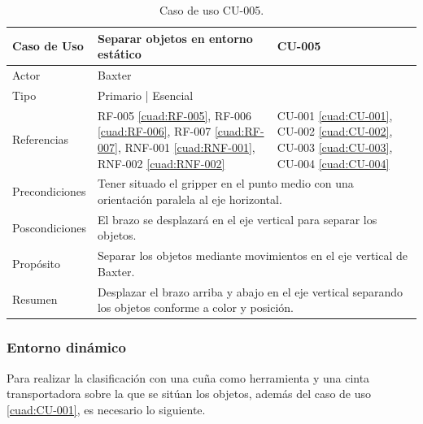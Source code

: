 \begin{table}[H]
	\centering
	\begin{tabular}{|p{2.5cm} | p{6cm} | p{5cm} |}
		\hline
		\textbf{Caso de Uso} & Separar objetos en entorno estático & \textbf{CU-005} \\
		\hline 
		Actor & \multicolumn{2}{|l|}{Baxter} \\
		\hline
		Tipo & \multicolumn{2}{|l|}{Primario | Esencial} \\
		\hline
		Referencias & RF-005 \ref{cuad:RF-005}, RF-006 \ref{cuad:RF-006}, RF-007 \ref{cuad:RF-007}, RNF-001 \ref{cuad:RNF-001}, RNF-002 \ref{cuad:RNF-002} & CU-001 \ref{cuad:CU-001}, CU-002 \ref{cuad:CU-002}, CU-003 \ref{cuad:CU-003}, CU-004 \ref{cuad:CU-004} \\
		\hline
		Precondiciones & \multicolumn{2}{|l|}{\parbox{30em}{Tener situado el gripper en el punto medio con una orientación paralela al eje horizontal.}} \\
		\hline
		Poscondiciones & \multicolumn{2}{|l|}{\parbox{30em}{El brazo se desplazará en el eje vertical para separar los objetos.}}\\
		\hline
		Propósito & \multicolumn{2}{|l|}{\parbox{30em}{Separar los objetos mediante movimientos en el eje vertical de Baxter.}} \\
		\hline
		Resumen & \multicolumn{2}{|l|}{\parbox{30em}{Desplazar el brazo arriba y abajo en el eje vertical separando los objetos conforme a color y posición.}} \\
		\hline
		
	\end{tabular}
	\caption{Caso de uso CU-005.}
	\label{cuad:CU-005}
\end{table}

\subsubsection{Entorno dinámico}
\noindent Para realizar la clasificación con una cuña como herramienta y una cinta transportadora sobre la que se sitúan los objetos, además del caso de uso \ref{cuad:CU-001}, es necesario lo siguiente. \\

